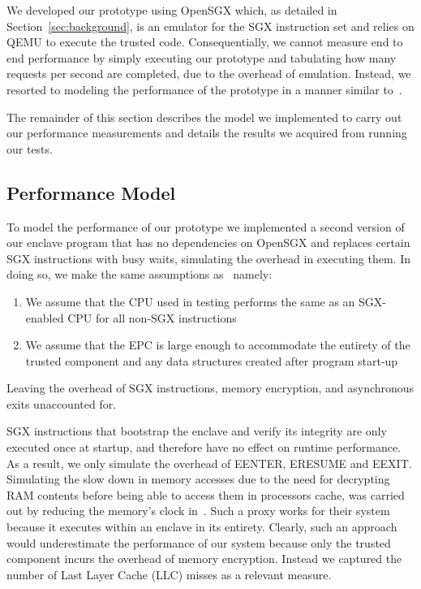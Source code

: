 \documentclass[../main.tex]{subfiles}
\begin{document}


We developed our prototype using OpenSGX which, as detailed in
Section~\ref{sec:background}, is an emulator for the SGX instruction
set and relies on QEMU to execute the trusted code. Consequentially,
we cannot measure end to end performance by simply executing our
prototype and tabulating how many requests per second are completed,
due to the overhead of emulation. Instead, we resorted to modeling the
performance of the prototype in a manner similar to~\cite{Baumann14}.

The remainder of this section describes the model we implemented to
carry out our performance measurements and details the results we
acquired from running our tests.

\subsection{Performance Model}

To model the performance of our prototype we implemented a second
version of our enclave program that has no dependencies on OpenSGX and
replaces certain SGX instructions with busy waits, simulating the
overhead in executing them. In doing so, we make the same assumptions
as~\cite{Baumann14} namely:
\begin{enumerate}
  \item We assume that the CPU used in testing performs the same as an
    SGX-enabled CPU for all non-SGX instructions
  \item We assume that the EPC is large enough to accommodate the
    entirety of the trusted component and any data structures created
    after program start-up
\end{enumerate}
Leaving the overhead of SGX instructions, memory encryption, and
asynchronous exits unaccounted for.

SGX instructions that bootstrap the enclave and verify its integrity
are only executed once at startup, and therefore have no effect on
runtime performance. As a result, we only simulate the overhead of
EENTER, ERESUME and EEXIT. Simulating the slow down in memory accesses
due to the need for decrypting RAM contents before being able to
access them in processors cache, was carried out by reducing the
memory's clock in~\cite{Baumann14}. Such a proxy works for their
system because it executes within an enclave in its entirety. Clearly,
such an approach would underestimate the performance of our system
because only the trusted component incurs the overhead of memory
encryption. Instead we captured the number of Last Layer Cache (LLC)
misses as a relevant measure.
\end{document}

